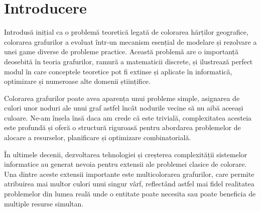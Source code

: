 \chapter*{Introducere} 

Introdusă inițial ca o problemă teoretică legată de colorarea hărților geografice, colorarea grafurilor a evoluat într-un mecanism esențial de modelare și rezolvare a unei game diverse de probleme practice. Această problemă are o importanță deosebită în teoria grafurilor, ramură a matematicii discrete, și ilustrează perfect modul în care conceptele teoretice pot fi extinse și aplicate în informatică, optimizare și numeroase alte domenii științifice.
   
Colorarea grafurilor poate avea aparența unui probleme simple, asignarea de culori unor noduri ale unui graf astfel încât nodurile vecine să nu aibă aceeași culoare. Ne-am înșela însă daca am crede că este trivială, complexitatea acesteia este profundă și oferă o structură riguroasă pentru abordarea problemelor de alocare a resurselor, planificare și optimizare combinatorială.

În ultimele decenii, dezvoltarea tehnologiei și creșterea complexității sistemelor informatice au generat nevoia pentru extensii ale problemei clasice de colorare. Una dintre aceste extensii importante este multicolorarea grafurilor, care permite atribuirea mai multor culori unui singur vârf, reflectând astfel mai fidel realitatea problemelor din lumea reală unde o entitate poate necesita sau poate beneficia de multiple resurse simultan.